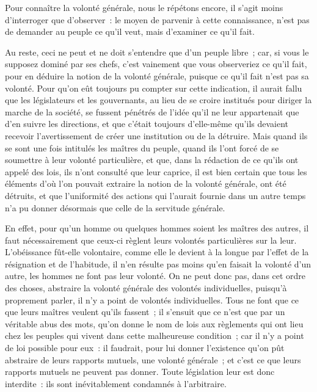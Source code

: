 \documentclass[french,twoside]{book} %
\begin{document}
Pour connaître la volonté générale, nous le répétons encore, il s’agit moins d’interroger que d’observer : le moyen de parvenir à cette connaissance, n’est pas de demander au peuple ce qu’il veut, mais d’examiner ce qu’il fait.\par
Au reste, ceci ne peut et ne doit s’entendre que d’un peuple libre ; car, si vous le supposez dominé par ses chefs, c’est vainement que vous observeriez ce qu’il fait, pour en déduire la notion de la volonté générale, puisque ce qu’il fait n’est pas sa volonté. Pour qu’on eût toujours pu compter sur cette indication, il aurait fallu que les législateurs et les gouvernants, au lieu de se croire institués pour diriger la marche de la société, se fussent pénétrés de l’idée qu’il ne leur appartenait que d’en suivre les directions, et que c’était toujours d’elle-même qu’ils devaient recevoir l’avertissement de créer une institution ou de la détruire. Mais quand ils se sont une fois intitulés les maîtres du peuple, quand ils l’ont forcé de se soumettre à leur volonté particulière, et que, dans la rédaction de ce qu’ils ont appelé des lois, ils n’ont consulté que leur caprice, il est bien certain que tous les éléments d’où l’on pouvait extraire la notion de la volonté générale, ont été détruits, et que l’uniformité des actions qui l’aurait fournie dans un autre temps n’a pu donner désormais que celle de la servitude générale.\par
En effet, pour qu’un homme ou quelques hommes soient les maîtres des autres, il faut nécessairement que ceux-ci règlent leurs volontés particulières sur la leur. L’obéissance fût-elle volontaire, comme elle le devient à la longue par l’effet de la résignation et de l’habitude, il n’en résulte pas moins qu’en faisait la volonté d’un autre, les hommes ne font pas leur volonté. On ne peut donc pas, dans cet ordre des choses, abstraire la volonté générale des volontés individuelles, puisqu’à proprement parler, il n’y a point de volontés individuelles. Tous ne font que ce que leurs maîtres veulent qu’ils fassent ; il s’ensuit que ce n’est que par un véritable abus des mots, qu’on donne le nom de lois aux règlements qui ont lieu chez les peuples qui vivent dans cette malheureuse condition ; car il n’y a point de loi possible pour eux : il faudrait, pour lui donner l’existence qu’on pût abstraire de leurs rapports mutuels, une volonté générale ; et c’est ce que leurs rapports mutuels ne peuvent pas donner. Toute législation leur est donc interdite : ils sont inévitablement condamnés à l’arbitraire.\par
\end{document}
